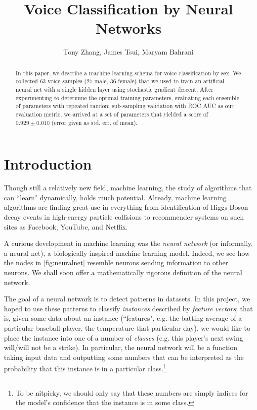 \documentclass[10pt]{article}
\title{Voice Classification by Neural Networks}
\author{
	{Tony Zhang},
	{James Tsui},
	{Maryam Bahrani}
}
\begin{document}
\maketitle

\begin{abstract}

In this paper, we describe a machine learning schema for voice classification by sex.
We collected 63 voice samples (27 male, 36 female) that we used to train an artificial neural net with a single hidden layer using stochastic gradient descent.
After experimenting to determine the optimal training parameters, evaluating each ensemble of parameters with repeated random sub-sampling validation with ROC AUC as our evaluation metric, we arrived at a set of parameters that yielded a score of $0.929 \pm 0.010$ (error given as std. err. of mean).
\end{abstract}

\section{Introduction}


Though still a relatively new field, machine learning, the study of algorithms that can ``learn" dynamically, holds much potential.
Already, machine learning algorithms are finding great use in everything from identification of Higgs Boson decay events in high-energy particle collisions to recommender systems on such sites as Facebook, YouTube, and Netflix.

A curious development in machine learning was the \emph{neural network} (or informally, a neural net), a biologically inspired machine learning model.
Indeed, we see how the nodes in \cref{fig:neuralnet} resemble neurons sending information to other neurons.
We shall soon offer a mathematically rigorous definition of the neural network.

The goal of a neural network is to detect patterns in datasets. In this project, we hoped to use these patterns to classify \emph{instances} described by \emph{feature vectors}; that is, given some data about an instance (``features", e.g. the batting average of a particular baseball player, the temperature that particular day), we would like to place the instance into one of a number of \emph{classes} (e.g. this player's next swing will/will not be a strike).
In particular, the neural network will be a function taking input data and outputting some numbers that can be interpreted as the probability that this instance is in a particular class.\footnote{To be nitpicky, we should only say that these numbers are simply indices for the model's confidence that the instance is in some class.}
\end{document}
